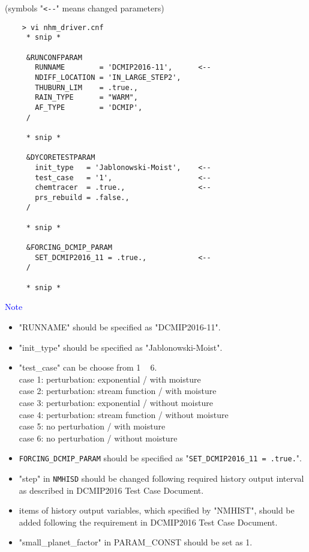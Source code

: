  \vspace{0.5cm}

 (symbols "\verb|<--|" means changed parameters)
 \begin{verbatim}
    > vi nhm_driver.cnf
     * snip *

     &RUNCONFPARAM
       RUNNAME        = 'DCMIP2016-11',      <--
       NDIFF_LOCATION = 'IN_LARGE_STEP2',
       THUBURN_LIM    = .true.,
       RAIN_TYPE      = "WARM",
       AF_TYPE        = 'DCMIP',
     /

     * snip *

     &DYCORETESTPARAM
       init_type   = 'Jablonowski-Moist',    <--
       test_case   = '1',                    <--
       chemtracer  = .true.,                 <--
       prs_rebuild = .false.,
     /

     * snip *

     &FORCING_DCMIP_PARAM
       SET_DCMIP2016_11 = .true.,            <--
     /

     * snip *
 \end{verbatim}

 \noindent \textcolor{blue}{{\sf Note}}
 \begin{itemize}
   \item "RUNNAME" should be specified as "DCMIP2016-11".
   \item "init\_type" should be specified as "Jablonowski-Moist".
   \item "test\_case" can be choose from 1 ~ 6.\\
          case 1: perturbation: exponential / with moisture \\
          case 2: perturbation: stream function / with moisture \\
          case 3: perturbation: exponential / without moisture \\
          case 4: perturbation: stream function / without moisture \\
          case 5: no perturbation / with moisture \\
          case 6: no perturbation / without moisture
   \item \verb|FORCING_DCMIP_PARAM| should be specified as "\verb|SET_DCMIP2016_11 = .true.|".
   \item "step" in \verb|NMHISD| should be changed following required history output interval
           as described in DCMIP2016 Test Case Document.
   \item items of history output variables, which specified by "NMHIST", should be added
         following the requirement in DCMIP2016 Test Case Document.
   \item "small\_planet\_factor" in PARAM\_CONST should be set as 1.
 \end{itemize}

